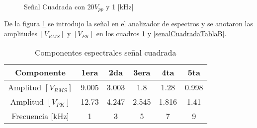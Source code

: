 \documentclass{article}
\begin{document}
\begin{figure}[h!]
    \centering

\caption{Señal Cuadrada con $20 V_{pp}
$ y 1 [kHz]}
\label{SenalCuadrada20Vpp}
\end{figure}

De la figura \ref{SenalCuadrada20Vpp} se introdujo la señal en el analizador de espectros y se anotaron las amplitudes $[V_{RMS}]$ y $[V_{PK}]$ en los cuadros \ref{senalCuadradaTablaA} y \ref{senalCuadradaTablaB}.\\ 

\begin{table}[h!]
\centering

\begin{tabular}{|c|c|c|c|c|c|}
\hline
Componente           & 1era  & 2da   & 3era  & 4ta   & 5ta   \\ \hline
Amplitud $[V_{RMS}]$ & 9.005 & 3.003 & 1.8   & 1.28  & 0.998 \\ \hline
Amplitud $[V_{PK}]$  & 12.73 & 4.247 & 2.545 & 1.816 & 1.41  \\ \hline
Frecuencia {[}kHz{]} & 1     & 3     & 5     & 7     & 9     \\ \hline
\end{tabular}

\caption{Componentes espectrales señal cuadrada}
\label{senalCuadradaTablaA}

\end{table}
\end{document}
